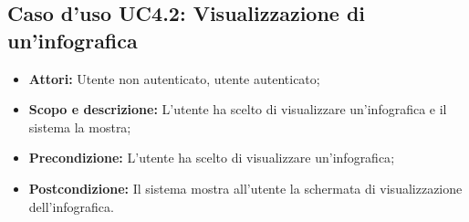 \subsection{Caso d'uso UC4.2: Visualizzazione di un'infografica}
\begin{itemize}
	\item \textbf{Attori:} Utente non autenticato, utente autenticato;
	\item \textbf{Scopo e descrizione:} L'utente ha scelto di visualizzare un'\gls{infografica} e il sistema la mostra;
	\item \textbf{Precondizione:} L'utente ha scelto di visualizzare un'\gls{infografica};
	\item \textbf{Postcondizione:} Il sistema mostra all'utente la schermata di visualizzazione dell'\gls{infografica}.
\end{itemize}

